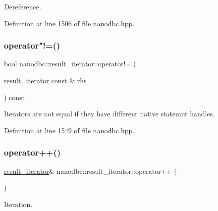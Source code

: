 Dereference. 



Definition at line 1506 of file nanodbc.\+hpp.

\mbox{\label{classnanodbc_1_1result__iterator_adb39628c4e759b39b85ba4a43b9f75e0}} 
\subsubsection{\texorpdfstring{operator"!=()}{operator!=()}}
{\footnotesize\ttfamily bool nanodbc\+::result\+\_\+iterator\+::operator!= (\begin{DoxyParamCaption}\item[{\mbox{\hyperlink{classnanodbc_1_1result__iterator}{result\+\_\+iterator}} const \&}]{rhs }\end{DoxyParamCaption}) const\hspace{0.3cm}{\ttfamily [inline]}}



Iterators are not equal if they have different native statemnt handles. 



Definition at line 1549 of file nanodbc.\+hpp.

\mbox{\label{classnanodbc_1_1result__iterator_ab63c554a6588e6dfb0a16dbba8e01247}} 
\subsubsection{\texorpdfstring{operator++()}{operator++()}\hspace{0.1cm}{\footnotesize\ttfamily [1/2]}}
{\footnotesize\ttfamily \mbox{\hyperlink{classnanodbc_1_1result__iterator}{result\+\_\+iterator}}\& nanodbc\+::result\+\_\+iterator\+::operator++ (\begin{DoxyParamCaption}{ }\end{DoxyParamCaption})\hspace{0.3cm}{\ttfamily [inline]}}



Iteration. 



